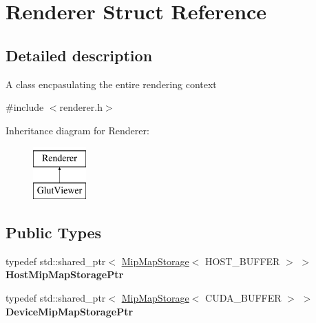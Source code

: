 \hypertarget{struct_renderer}{}\section{Renderer Struct Reference}
\label{struct_renderer}


\subsection{Detailed description}
A class encpasulating the entire rendering context 

{\ttfamily \#include $<$renderer.\+h$>$}

Inheritance diagram for Renderer\+:\begin{figure}[H]
\begin{center}
\leavevmode
\includegraphics[height=2.000000cm]{struct_renderer}
\end{center}
\end{figure}
\subsection*{Public Types}
\begin{DoxyCompactItemize}
\item 
\mbox{\label{struct_renderer_afc41ed01b6c4027ea9c772f7e6e50a1f}} 
typedef std\+::shared\+\_\+ptr$<$ \hyperlink{struct_mip_map_storage}{Mip\+Map\+Storage}$<$ H\+O\+S\+T\+\_\+\+B\+U\+F\+F\+ER $>$ $>$ {\bfseries Host\+Mip\+Map\+Storage\+Ptr}
\item 
\mbox{\label{struct_renderer_a67d95bc675ee40e773051fb24fb4470e}} 
typedef std\+::shared\+\_\+ptr$<$ \hyperlink{struct_mip_map_storage}{Mip\+Map\+Storage}$<$ C\+U\+D\+A\+\_\+\+B\+U\+F\+F\+ER $>$ $>$ {\bfseries Device\+Mip\+Map\+Storage\+Ptr}
\end{DoxyCompactItemize}

